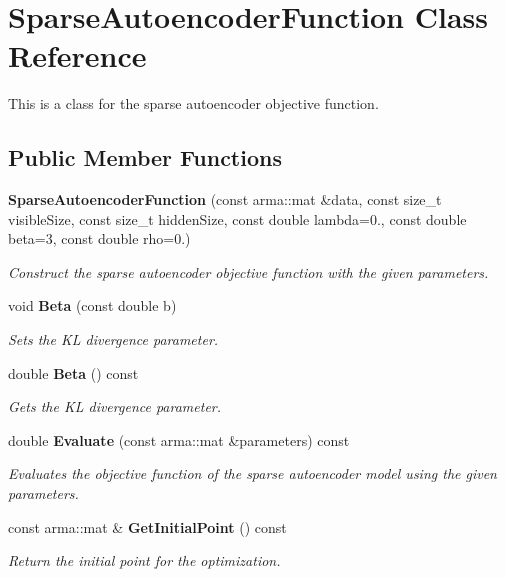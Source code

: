 \section{Sparse\+Autoencoder\+Function Class Reference}
\label{classmlpack_1_1nn_1_1SparseAutoencoderFunction}


This is a class for the sparse autoencoder objective function.  


\subsection*{Public Member Functions}
\begin{DoxyCompactItemize}
\item 
\textbf{ Sparse\+Autoencoder\+Function} (const arma\+::mat \&data, const size\+\_\+t visible\+Size, const size\+\_\+t hidden\+Size, const double lambda=0., const double beta=3, const double rho=0.)
\begin{DoxyCompactList}\small\item\em Construct the sparse autoencoder objective function with the given parameters. \end{DoxyCompactList}\item 
void \textbf{ Beta} (const double b)
\begin{DoxyCompactList}\small\item\em Sets the KL divergence parameter. \end{DoxyCompactList}\item 
double \textbf{ Beta} () const
\begin{DoxyCompactList}\small\item\em Gets the KL divergence parameter. \end{DoxyCompactList}\item 
double \textbf{ Evaluate} (const arma\+::mat \&parameters) const
\begin{DoxyCompactList}\small\item\em Evaluates the objective function of the sparse autoencoder model using the given parameters. \end{DoxyCompactList}\item 
const arma\+::mat \& \textbf{ Get\+Initial\+Point} () const
\begin{DoxyCompactList}\small\item\em Return the initial point for the optimization. \end{DoxyCompactList}\item 

\end{DoxyCompactItemize}
